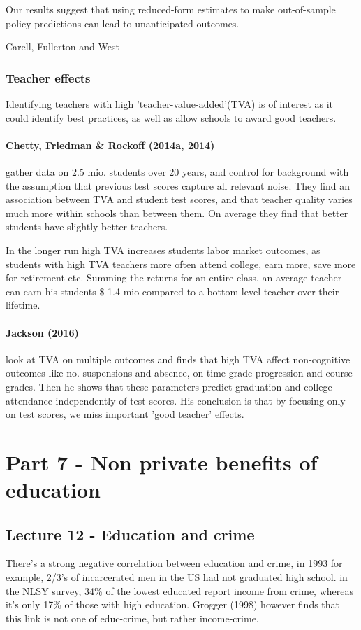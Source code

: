 \documentclass[12pt, a4paper]{article}
\begin{document}
\begin{multicols}{2}
\epigraph{Our results suggest that using reduced-form estimates to make out-of-sample policy predictions can lead to unanticipated outcomes.}{Carell, Fullerton and West }

\subsubsection{Teacher effects}
Identifying teachers with high 'teacher-value-added'(TVA) is of interest as it could identify best practices, as well as allow schools to award good teachers.

\paragraph{Chetty, Friedman \& Rockoff (2014a, 2014)} gather data on 2.5 mio. students over 20 years, and control for background with the assumption that previous test scores capture all relevant noise. They find an association between TVA and student test scores, and that teacher quality varies much more within schools than between them. On average they find that better students have slightly better teachers.

In the longer run high TVA increases students labor market outcomes, as students with high TVA teachers more often attend college, earn more, save more for retirement etc. Summing the returns for an entire class, an average teacher can earn his students \$ 1.4 mio compared to a bottom level teacher over their lifetime.

\paragraph{Jackson (2016)} look at TVA on multiple outcomes and finds that high TVA affect non-cognitive outcomes like no. suspensions and absence, on-time grade progression and course grades. Then he shows that these parameters predict graduation and college attendance independently of test scores. His conclusion is that by focusing only on test scores, we miss important 'good teacher' effects.


\section{Part 7 - Non private benefits of education}
\subsection{Lecture 12 - Education and crime}
There's a strong negative correlation between education and crime, in 1993 for example, 2/3's of incarcerated men in the US had not graduated high school. in the NLSY survey, 34\% of the lowest educated report income from crime, whereas it's only 17\% of those with high education. Grogger (1998) however finds that this link is not one of educ-crime, but rather income-crime.


\end{multicols}
\end{document}
